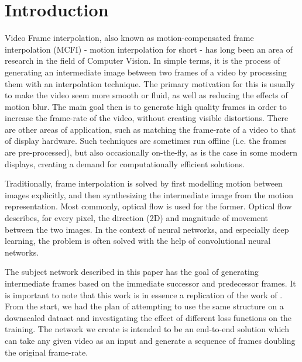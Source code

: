 \documentclass[10pt,twocolumn,letterpaper]{article}
\begin{document}

\section{Introduction}
\label{sec:introduction}

Video Frame interpolation, also known as motion-compensated frame interpolation (MCFI) - motion interpolation for short - has long been an area of research in the field of Computer Vision. In simple terms, it is the process of generating an intermediate image between two frames of a video by processing them with an interpolation technique. The primary motivation for this is usually to make the video seem more smooth or fluid, as well as reducing the effects of motion blur. The main goal then is to generate high quality frames in order to increase the frame-rate of the video, without creating visible distortions. There are other areas of application, such as matching the frame-rate of a video to that of display hardware. Such techniques are sometimes run offline (i.e. the frames are pre-processed), but also occasionally on-the-fly, as is the case in some modern displays, creating a demand for computationally efficient solutions.

Traditionally, frame interpolation is solved by first modelling motion between images explicitly, and then synthesizing the intermediate image from the motion representation. Most commonly, optical flow is used for the former. Optical flow describes, for every pixel, the direction (2D) and magnitude of movement between the two images.
In the context of neural networks, and especially deep learning, the problem is often solved with the help of convolutional neural networks. 

The subject network described in this paper has the goal of generating intermediate frames based on the immediate successor and predecessor frames.
It is important to note that this work is in essence a replication of the work of \citeauthor{SepConv}. From the start, we had the plan of attempting to use the same structure on a downscaled dataset and investigating the effect of different loss functions on the training.
The network we create is intended to be an end-to-end solution which can take any given video as an input and generate a sequence of frames doubling the original frame-rate.

\end{document}
